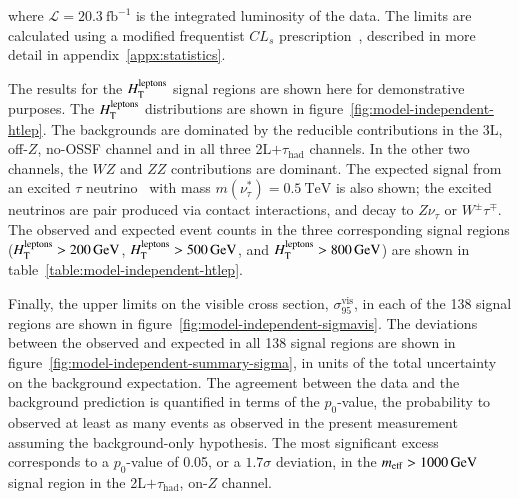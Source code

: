 where $\mathcal{L}=20.3~\mbox{fb}^{-1}$ is the integrated luminosity of the data. The limits are calculated using a modified frequentist $CL_s$ prescription~\cite{cls}, described in more detail in appendix~\ref{appx:statistics}. 

The results for the $H_{\mathrm{T}}^{\mathrm{leptons}}$ signal regions are shown here for demonstrative purposes. 
The $H_{\mathrm{T}}^{\mathrm{leptons}}$ distributions are shown in figure~\ref{fig:model-independent-htlep}. The backgrounds are dominated by the reducible contributions in the 3L, off-$Z$, no-OSSF channel and in all three 2L$+\tau_{\mathrm{had}}$ channels. In the other two channels, the $WZ$ and $ZZ$ contributions are dominant. The expected signal from an excited $\tau$ neutrino~\cite{Baur:1990tu} with mass $m(\nu^*_{\tau})=\SI{0.5}{\tera\electronvolt}$ is also shown; the excited neutrinos are pair produced via contact interactions, and decay to $Z\nu_{\tau}$ or $W^{\pm}\tau^{\mp}$. The observed and expected event counts in the three corresponding signal regions ($H_{\mathrm{T}}^{\mathrm{leptons}}>\SI{200}{\giga\electronvolt}$, $H_{\mathrm{T}}^{\mathrm{leptons}}>\SI{500}{\giga\electronvolt}$, and $H_{\mathrm{T}}^{\mathrm{leptons}}>\SI{800}{\giga\electronvolt}$) are shown in table~\ref{table:model-independent-htlep}. 

Finally, the upper limits on the visible cross section, $\sigma_{95}^{\mathrm{vis}}$, in each of the 138 signal regions are shown in figure~\ref{fig:model-independent-sigmavis}. The deviations between the observed and expected in all 138 signal regions are shown in figure~\ref{fig:model-independent-summary-sigma}, in units of the total uncertainty on the background expectation. The agreement between the data and the background prediction is quantified in terms of the $p_0$-value, the probability to observed at least as many events as observed in the present measurement assuming the background-only hypothesis. The most significant excess corresponds to a $p_0$-value of 0.05, or a $1.7\sigma$ deviation, in the $m_{\mathrm{eff}}>\SI{1000}{\giga\electronvolt}$ signal region in the 2L$+\tau_{\mathrm{had}}$, on-$Z$ channel. 

